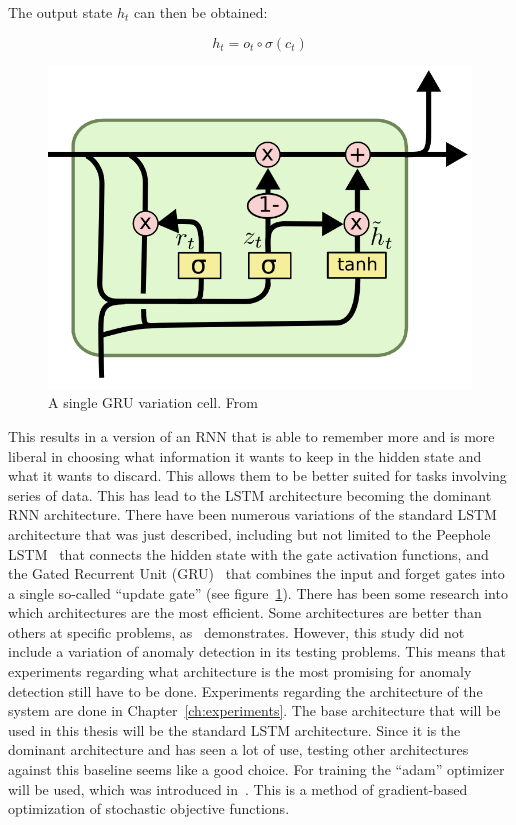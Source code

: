 The output state \(h_t\) can then be obtained:

\begin{equation} \label{eq:something}
h_t = o_t \circ \sigma(c_t)
\end{equation}

\begin{figure}
	\begin{center}
		\includegraphics[scale=0.5]{rnn/gru_cell}
	\end{center}
	\caption{A single GRU variation cell. From~\cite{olah2015understanding}\label{fig:gru_cell}}
\end{figure}

This results in a version of an RNN that is able to remember more and is more liberal in choosing what information it wants to keep in the hidden state and what it wants to discard. This allows them to be better suited for tasks involving series of data. This has lead to the LSTM architecture becoming the dominant RNN architecture. There have been numerous variations of the standard LSTM architecture that was just described, including but not limited to the Peephole LSTM~\cite{gers2002learning} that connects the hidden state with the gate activation functions, and the Gated Recurrent Unit (GRU)~\cite{cho2014learning} that combines the input and forget gates into a single so-called \enquote{update gate} (see figure~\ref{fig:gru_cell}). There has been some research into which architectures are the most efficient. Some architectures are better than others at specific problems, as~\cite{jozefowicz2015empirical} demonstrates. However, this study did not include a variation of anomaly detection in its testing problems. This means that experiments regarding what architecture is the most promising for anomaly detection still have to be done. Experiments regarding the architecture of the system are done in Chapter~\ref{ch:experiments}. The base architecture that will be used in this thesis will be the standard LSTM architecture. Since it is the dominant architecture and has seen a lot of use, testing other architectures against this baseline seems like a good choice. For training the \enquote{adam} optimizer will be used, which was introduced in~\cite{kingma2014adam}. This is a method of gradient-based optimization of stochastic objective functions.